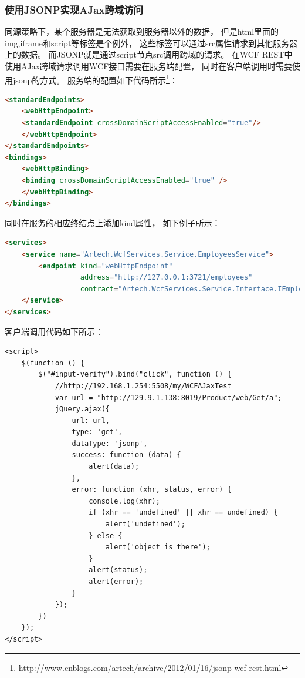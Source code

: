 \documentclass{book}
\begin{document}
\subsubsection{使用JSONP实现AJax跨域访问}

同源策略下，某个服务器是无法获取到服务器以外的数据，
但是html里面的img,iframe和script等标签是个例外，
这些标签可以通过src属性请求到其他服务器上的数据。
而JSONP就是通过script节点src调用跨域的请求。
在WCF REST中使用AJax跨域请求调用WCF接口需要在服务端配置，
同时在客户端调用时需要使用jsonp的方式。
服务端的配置如下代码所示\footnote{http://www.cnblogs.com/artech/archive/2012/01/16/jsonp-wcf-rest.html}：

\begin{lstlisting}[language=HTML]
<standardEndpoints>
	<webHttpEndpoint>
	<standardEndpoint crossDomainScriptAccessEnabled="true"/>
	</webHttpEndpoint>
</standardEndpoints>
<bindings>
	<webHttpBinding>
	<binding crossDomainScriptAccessEnabled="true" />
	</webHttpBinding>
</bindings>
\end{lstlisting}

同时在服务的相应终结点上添加kind属性，
如下例子所示：

\begin{lstlisting}[language=HTML]
<services>  
	<service name="Artech.WcfServices.Service.EmployeesService">
		<endpoint kind="webHttpEndpoint" 
	         	  address="http://127.0.0.1:3721/employees"
	       		  contract="Artech.WcfServices.Service.Interface.IEmployees"/>
	</service>
</services>
\end{lstlisting}

客户端调用代码如下所示：

\begin{lstlisting}[language=VBScript]
<script>
    $(function () {
        $("#input-verify").bind("click", function () {                 
            //http://192.168.1.254:5508/my/WCFAJaxTest
            var url = "http://129.9.1.138:8019/Product/web/Get/a";
            jQuery.ajax({                    
                url: url,                                       
                type: 'get',                    
                dataType: 'jsonp', 
                success: function (data) {                        
                    alert(data);                          
                },
                error: function (xhr, status, error) {
                    console.log(xhr);
                    if (xhr == 'undefined' || xhr == undefined) {
                        alert('undefined');
                    } else {
                        alert('object is there');
                    }
                    alert(status);
                    alert(error);
                }
            });
        })
    });
</script>
\end{lstlisting}
\end{document}
